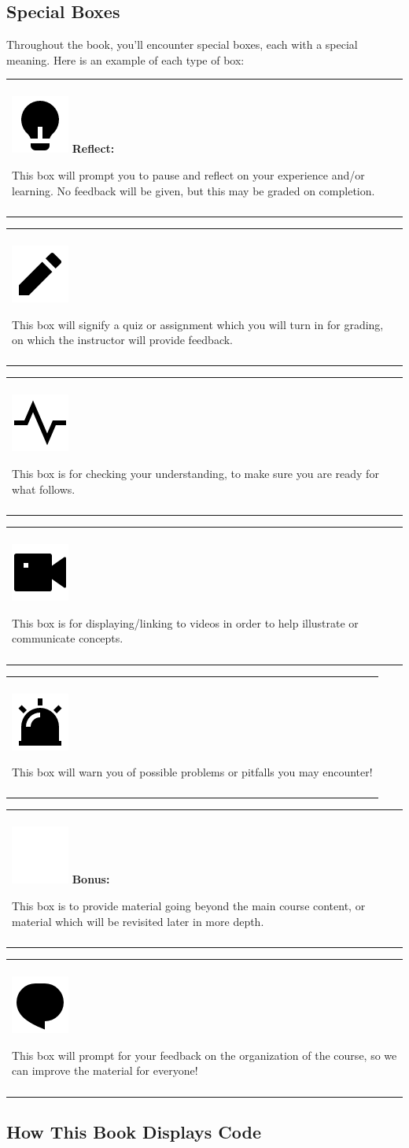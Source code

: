 \documentclass[
]{book}
\newenvironment{bonus}
{
  \begin{center}
  \begin{tabular}{|>{\columncolor{bonus}\color{white}}p{0.9\textwidth}|}\hline\\
  \includegraphics[scale=0.1]{src/images/sun-fill-invert.png}
  \textbf{Bonus:}
}
{\\\\\hline
  \end{tabular}
  \end{center}
}
\newenvironment{reflect}
{
  \begin{center}
  \begin{tabular}{|>{\columncolor{reflect}}p{0.9\textwidth}|}
  \hline\\
  \includegraphics[scale=0.1]{src/images/lightbulb-fill.png}
  \textbf{Reflect:}
}
{\\\\\hline
  \end{tabular}
  \end{center}
}
\newenvironment{assessment}
{
  \begin{center}
  \begin{tabular}{|>{\columncolor{assessment}}p{0.9\textwidth}|}
  \hline\\
  \includegraphics[scale=0.1]{src/images/pencil-fill.png}
}
{\\\\\hline
  \end{tabular}
  \end{center}
}
\newenvironment{progress}
{
  \begin{center}
  \begin{tabular}{|>{\columncolor{progress}}p{0.9\textwidth}|}
  \hline\\
  \includegraphics[scale=0.1]{src/images/pulse-line.png}
}
{\\\\\hline
  \end{tabular}
  \end{center}
}
\newenvironment{video}
{
  \begin{center}
  \begin{tabular}{|>{\columncolor{video}}p{0.9\textwidth}|}
  \hline\\
  \includegraphics[scale=0.1]{src/images/vidicon-fill.png}
}
{\\\\\hline
  \end{tabular}
  \end{center}
}
\newenvironment{caution}
{
  \begin{center}
  \begin{tabular}{|>{\columncolor{caution}}p{0.9\textwidth}|}
  \hline\\
  \includegraphics[scale=0.1]{src/images/alarm-warning-fill.png}
}
{\\\\\hline
  \end{tabular}
  \end{center}
}
\newenvironment{feedback}
{
  \begin{center}
  \begin{tabular}{|>{\columncolor{feedback}}p{0.9\textwidth}|}
  \hline\\
  \includegraphics[scale=0.1]{src/images/chat-1-fill.png}
}
{\\\\\hline
  \end{tabular}
  \end{center}
}
\begin{document}
\hypertarget{special-boxes}{%
\subsection{Special Boxes}\label{special-boxes}}

Throughout the book, you'll encounter special boxes, each with a special meaning.
Here is an example of each type of box:

\begin{reflect}
This box will prompt you to pause and reflect on your experience and/or
learning. No feedback will be given, but this may be graded on
completion.
\end{reflect}

\begin{assessment}
This box will signify a quiz or assignment which you will turn in for
grading, on which the instructor will provide feedback.
\end{assessment}

\begin{progress}
This box is for checking your understanding, to make sure you are ready
for what follows.
\end{progress}

\begin{video}
This box is for displaying/linking to videos in order to help illustrate
or communicate concepts.
\end{video}

\begin{caution}
This box will warn you of possible problems or pitfalls you may
encounter!
\end{caution}

\begin{bonus}
This box is to provide material going beyond the main course content, or
material which will be revisited later in more depth.
\end{bonus}

\begin{feedback}
This box will prompt for your feedback on the organization of the
course, so we can improve the material for everyone!
\end{feedback}

\hypertarget{how-this-book-displays-code}{%
\subsection{How This Book Displays Code}\label{how-this-book-displays-code}}
\end{document}
